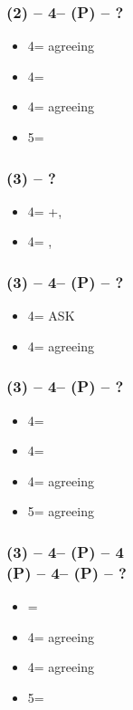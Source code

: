 \subsubsection*{(2\hearts) -- 4\diams -- (P) -- ?}
\begin{itemize}
    \item 4\hearts = agreeing \spades
    \item 4\spades = \soff
    \item 4\nt = agreeing \diams
    \item 5\diams = \soff
\end{itemize}

\subsubsection*{(3\clubs) -- ?}
\begin{itemize}
    \item 4\clubs = \diams+\major, \gf
    \item 4\diams = \major, \gf
\end{itemize}

\subsubsection*{(3\clubs) -- 4\clubs -- (P) -- ?}
\begin{itemize}
    \item 4\diams = ASK \major
    \item 4\hearts = agreeing \diams \vimp
\end{itemize}

\subsubsection*{(3\clubs) -- 4\diams -- (P) -- ?}
\begin{itemize}
    \item 4\hearts = \soff
    \item 4\spades = \soff
    \item 4\nt = agreeing \hearts
    \item 5\clubs = agreeing \spades
\end{itemize}

\subsubsection*{(3\clubs) -- 4\clubs -- (P) -- 4\diams
                \\(P) -- 4\hearts -- (P) -- ?}
\begin{itemize}
    \item \pass = \soff
    \item 4\spades = agreeing \diams
    \item 4\nt = agreeing \hearts
    \item 5\diams = \soff
\end{itemize}

